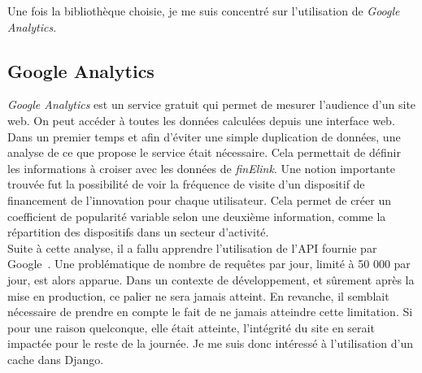 Une fois la bibliothèque choisie, je me suis concentré sur l'utilisation de \textit{Google Analytics}.\\

\subsection{Google Analytics}
\textit{Google Analytics} est un service gratuit qui permet de mesurer l'audience d'un site web. On peut accéder à toutes les données calculées depuis une interface web. Dans un premier temps et afin d'éviter une simple duplication de données, une analyse de ce que propose le service était nécessaire. Cela permettait de définir les informations à croiser avec les données de \textit{finElink}. Une notion importante trouvée fut la possibilité de voir la fréquence de visite d'un dispositif de financement de l'innovation pour chaque utilisateur. Cela permet de créer un coefficient de popularité variable selon une deuxième information, comme la répartition des dispositifs dans un secteur d'activité.\\

Suite à cette analyse, il a fallu apprendre l'utilisation de l'API fournie par Google~\cite{gaapi}. Une problématique de nombre de requêtes par jour, limité à 50 000 par jour, est alors apparue. Dans un contexte de développement, et sûrement après la mise en production, ce palier ne sera jamais atteint. En revanche, il semblait nécessaire de prendre en compte le fait de ne jamais atteindre cette limitation. Si pour une raison quelconque, elle était atteinte, l'intégrité du site en serait impactée pour le reste de la journée. Je me suis donc intéressé à l'utilisation d'un cache dans Django.

